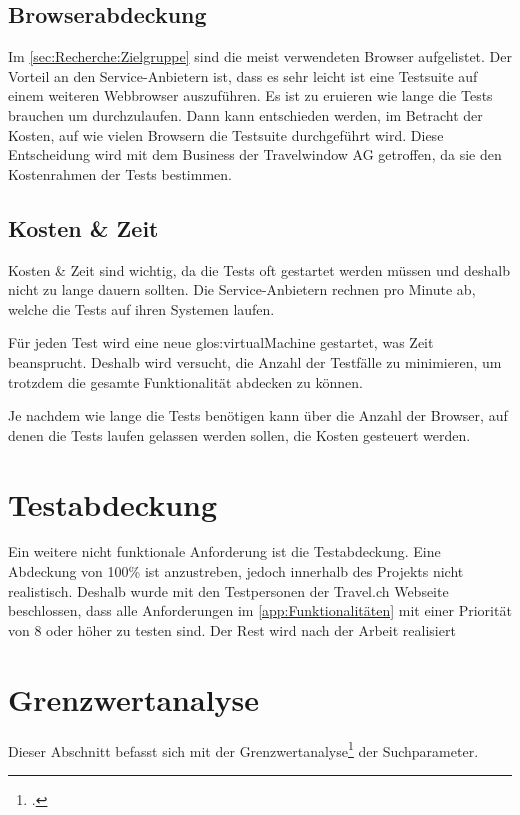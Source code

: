 \subsection{Browserabdeckung}
Im \cref{sec:Recherche:Zielgruppe}  sind die meist verwendeten Browser aufgelistet. Der Vorteil an den Service-Anbietern ist, dass es sehr leicht ist eine Testsuite auf einem weiteren Webbrowser auszuführen. Es ist zu eruieren wie lange die Tests brauchen um durchzulaufen. Dann kann entschieden werden, im Betracht der Kosten, auf wie vielen Browsern die Testsuite durchgeführt wird. Diese Entscheidung wird mit dem Business der Travelwindow AG getroffen, da sie den Kostenrahmen der Tests bestimmen.

\subsection{Kosten \& Zeit}
Kosten \& Zeit sind wichtig, da die Tests oft gestartet werden müssen und deshalb nicht zu lange dauern sollten. Die Service-Anbietern rechnen pro Minute ab, welche die Tests auf ihren Systemen laufen. 

Für jeden Test wird eine neue \Gls{glos:virtualMachine} gestartet, was Zeit beansprucht. Deshalb wird versucht, die Anzahl der Testfälle zu minimieren, um trotzdem die gesamte Funktionalität abdecken zu können.

Je nachdem wie lange die Tests benötigen kann über die Anzahl der Browser, auf denen die Tests laufen gelassen werden sollen, die Kosten gesteuert werden.

\section{Testabdeckung}
\label{sec:analyse:testabdeckung}
Ein weitere nicht funktionale Anforderung ist die Testabdeckung. Eine Abdeckung von 100\% ist anzustreben, jedoch innerhalb des Projekts nicht realistisch. Deshalb wurde mit den Testpersonen der Travel.ch Webseite beschlossen, dass alle Anforderungen im \cref{app:Funktionalitäten}  mit einer Priorität von 8 oder höher zu testen sind. Der Rest wird nach der Arbeit realisiert

\section{Grenzwertanalyse}
\label{sec:analyse:grenzwertanalyse}
Dieser Abschnitt befasst sich mit der Grenzwertanalyse\footcite{Dynamisches_Software-Testverfahren__Wikipedia_2015-10-25} der Suchparameter.

